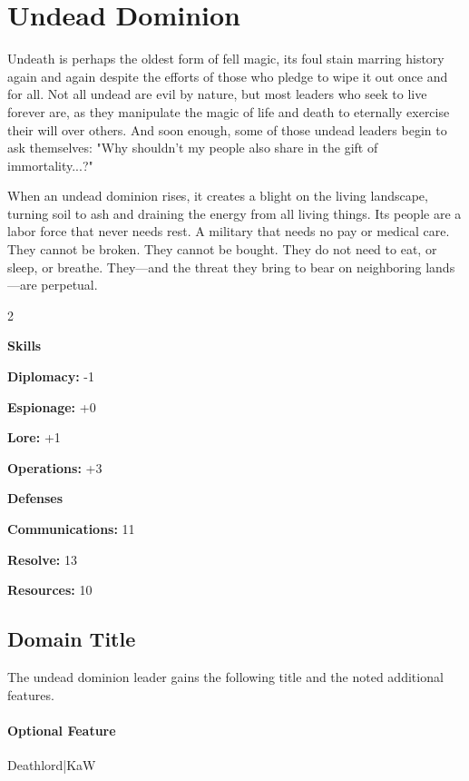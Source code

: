 \documentclass[10pt,a4paper,twoside,bg=print,twocolumn,openany,nodeprecatedcode]{dndbook}
\begin{document}
\section{Undead Dominion}
Undeath is perhaps the oldest form of fell magic, its foul stain marring history again and again despite the efforts of those who pledge to wipe it out once and for all. Not all undead are evil by nature, but most leaders who seek to live forever are, as they manipulate the magic of life and death to eternally exercise their will over others. And soon enough, some of those undead leaders begin to ask themselves: "Why shouldn't my people also share in the gift of immortality...?"

When an undead dominion rises, it creates a blight on the living landscape, turning soil to ash and draining the energy from all living things. Its people are a labor force that never needs rest. A military that needs no pay or medical care. They cannot be broken. They cannot be bought. They do not need to eat, or sleep, or breathe. They—and the threat they bring to bear on neighboring lands—are perpetual.


\begin{itemize}
\begin{multicols}{2}
\item \textbf{Skills}
\item \textbf{Diplomacy:} -1
\item \textbf{Espionage:} +0
\item \textbf{Lore:} +1
\item \textbf{Operations:} +3
\item \textbf{Defenses}
\item \textbf{Communications:} 11
\item \textbf{Resolve:} 13
\item \textbf{Resources:} 10
\end{multicols}

\end{itemize}

\subsection{Domain Title}
The undead dominion leader gains the following title and the noted additional features.

\paragraph{Optional Feature}
Deathlord|KaW
\end{document}
